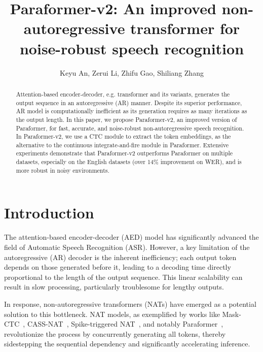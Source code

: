 \documentclass[runningheads]{llncs}
\begin{document}
%
\title{Paraformer-v2: An improved non-autoregressive transformer for noise-robust speech recognition}
%
%
\author{Keyu An, Zerui Li, Zhifu Gao, Shiliang Zhang}
%

%
%
\maketitle              %
%
\begin{abstract}
Attention-based encoder-decoder, e.g. transformer and its variants, generates the output sequence in an autoregressive (AR) manner. Despite its superior performance, AR model is computationally inefficient as its generation requires as many iterations as the output length. In this paper, we propose Paraformer-v2, an improved version of Paraformer, for fast, accurate, and noise-robust non-autoregressive speech recognition. In Paraformer-v2, we use a CTC module to extract the token embeddings, as the alternative to the continuous integrate-and-fire module in Paraformer. Extensive experiments demonstrate that Paraformer-v2 outperforms Paraformer on multiple datasets, especially on the English datasets (over 14\% improvement on WER), and is more robust in noisy environments.

\end{abstract}

\section{Introduction}
The attention-based encoder-decoder (AED) model has significantly advanced the field of Automatic Speech Recognition (ASR). However, a key limitation of the autoregressive (AR) decoder is the inherent inefficiency; each output token depends on those generated before it, leading to a decoding time directly proportional to the length of the output sequence. This linear scalability can result in slow processing, particularly troublesome for lengthy outputs.

In response, non-autoregressive transformers (NATs) have emerged as a potential solution to this bottleneck. NAT models, as exemplified by works like Mask-CTC~\cite{mask-ctc}, CASS-NAT~\cite{cass-nat}, Spike-triggered NAT~\cite{spike}, and notably Paraformer~\cite{paraformer}, revolutionize the process by concurrently generating all tokens, thereby sidestepping the sequential dependency and significantly accelerating inference.
\end{document}
